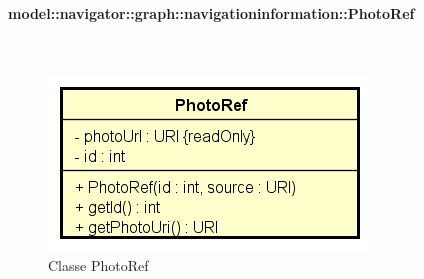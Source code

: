 \documentclass[../DefinizioneDiProdotto.tex]{subfiles}
\begin{document}
\paragraph{model::navigator::graph::navigationinformation::PhotoRef}
\
\begin{figure}[H]
	\centering
	\includegraphics[width=\maxwidth]{img/PhotoRef.png}
	\caption{Classe PhotoRef}\label{fig:model::navigator::graph::navigationinformation::PhotoRef} 
\end{figure}
\end{document}

